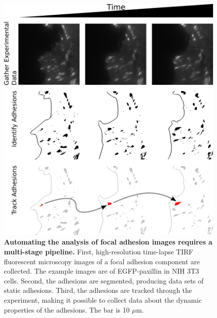 \documentclass[letterpaper,draft]{article}
\begin{document}
\begin{figure}[htbp]
\begin{center}
\includegraphics[width=\textwidth]{../figures/FA_workflow/graphic_workflow}
\caption{
{\bf Automating the analysis of focal adhesion images requires a multi-stage pipeline.} First, high-resolution time-lapse TIRF fluorescent microscopy images of a focal adhesion component are collected. The example images are of EGFP-paxillin in NIH 3T3 cells. Second, the adhesions are segmented, producing data sets of static adhesions. Third, the adhesions are tracked through the experiment, making it possible to collect data about the dynamic properties of the adhesions. The bar is 10 $\mu$m.
}
\label{method_flow}
\end{center}
\end{figure}
\end{document}
